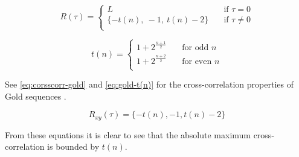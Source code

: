 \begin{equation}
	\label{eq:autocorr-gold}
	R(\tau) = 
		\begin{cases}
			L    							& \quad \text{if } \tau = 0 \\
			\{ -t(n), \ -1, \ t(n) - 2  \} 	& \quad \text{if } \tau \neq 0 \\
		\end{cases}
\end{equation}

\begin{equation}
	\label{eq:gold-t(n)}
	t(n) = 
		\begin{cases}
			1 + 2^{\frac{n+1}{2}} & \quad \text{for odd } n \\
			1 + 2^{\frac{n+2}{2}} & \quad \text{for even } n \\
		\end{cases}
\end{equation}

See \autoref{eq:corsscorr-gold} and \autoref{eq:gold-t(n)} for the cross-correlation properties of Gold sequences \cite{mitra2008pseudo}.

\begin{equation}
	\label{eq:corsscorr-gold}
	R_{xy}(\tau) = 	\{ -t(n), -1, t(n) - 2  \} 
\end{equation}


From these equations it is clear to see that the absolute maximum cross-correlation is bounded by $t(n)$.





%
%
%
%		
%



